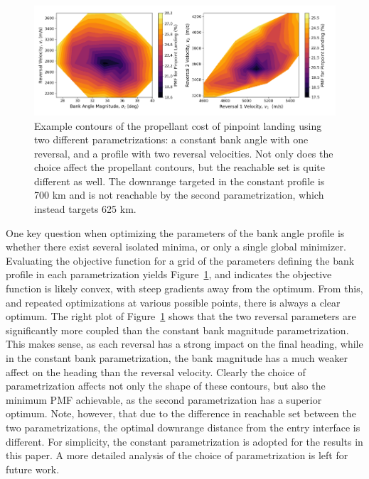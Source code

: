 \begin{figure}[h!]
		\centering
		\includegraphics[width=1\textwidth]{../AAS20/ObjectiveContours} 
		\caption{Example contours of the propellant cost of pinpoint landing using two different parametrizations: a constant bank angle with one reversal, and a profile with two reversal velocities. Not only does the choice affect the propellant contours, but the reachable set is quite different as well. The downrange targeted in the constant profile is 700 km and is not reachable by the second parametrization, which instead targets 625 km. }
		\label{fig_objective_contour}
\end{figure}
One key question when optimizing the parameters of the bank angle profile is whether there exist several isolated minima, or only a single global minimizer. 
Evaluating the objective function for a grid of the parameters defining the bank profile in each parametrization yields Figure~\ref{fig_objective_contour}, and indicates the objective function is likely convex, with steep gradients away from the optimum. From this, and repeated optimizations at various possible points, there is always a clear optimum.  The right plot of Figure~\ref{fig_objective_contour} shows that the two reversal parameters are significantly more coupled than the constant bank magnitude parametrization. This makes sense, as each reversal has a strong impact on the final heading, while in the constant bank parametrization, the bank magnitude has a much weaker affect on the heading than the reversal velocity. Clearly the choice of parametrization affects not only the shape of these contours, but also the minimum PMF achievable, as the second parametrization has a superior optimum. Note, however, that due to the difference in reachable set between the two parametrizations, the optimal downrange distance from the entry interface is different. For simplicity, the constant parametrization is adopted for the results in this paper. A more detailed analysis of the choice of parametrization is left for future work.

